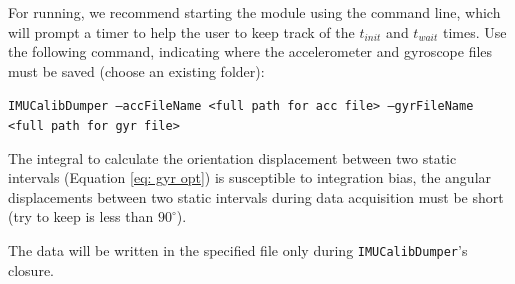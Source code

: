 For running, we recommend starting the module using the command line, which will prompt a timer to help the user to keep track of the $t_{init}$ and $t_{wait}$ times.
%
Use the following command, indicating where the accelerometer and gyroscope files must be saved (choose an existing folder): 

\texttt{IMUCalibDumper --accFileName <full path for acc file> --gyrFileName <full path for gyr file>}

\begin{important}
	The integral to calculate the orientation displacement between two static intervals (Equation \ref{eq: gyr opt}) is susceptible to integration bias, the angular displacements between two static intervals during data acquisition must be short (try to keep is less than $90^\circ$).
\end{important}

The data will be written in the specified file only during \texttt{IMUCalibDumper}'s closure.
